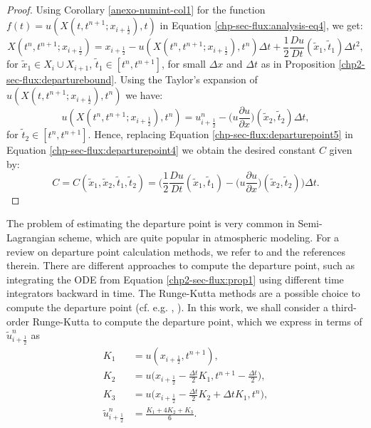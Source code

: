 \begin{proof}
Using Corollary \ref{anexo-numint-col1} for the function $f(t) = u(X(t,t^{n+1};x_{i+\frac{1}{2}}),t)$
in Equation  \eqref{chp-sec-flux:analysis-eq4}, we get:
\begin{equation}
	\label{chp-sec-flux:departurepoint4}
	X(t^n,t^{n+1};x_{i+\frac{1}{2}}) = x_{i+\frac{1}{2}} - u(X(t^n,t^{n+1};x_{i+\frac{1}{2}}),t^n)\Delta t + \frac{1}{2}\frac{Du}{Dt}(\tilde{x}_1,\tilde{t}_1)\Delta t^2,
\end{equation}
for $\tilde{x}_1 \in X_i \cup X_{i+1}$, $\tilde{t}_1 \in [t^n, t^{n+1}]$, for small $\Delta x$ and $\Delta t$ as in Proposition \ref{chp2-sec-flux:departurebound}.
Using the Taylor's expansion of $u(X(t,t^{n+1};x_{i+\frac{1}{2}}),t^n)$ we have:
\begin{equation}
	\label{chp-sec-flux:departurepoint5}
	u(X(t^n,t^{n+1};x_{i+\frac{1}{2}}),t^n) = u^n_{i+\frac{1}{2}} - \bigg(u\frac{\partial u}{\partial x}\bigg)(\tilde{x}_2,\tilde{t}_2)\Delta t,
\end{equation}
for $\tilde{t}_2 \in [t^n, t^{n+1}]$.
Hence, replacing Equation \eqref{chp-sec-flux:departurepoint5} in Equation \eqref{chp-sec-flux:departurepoint4} 
we obtain the desired constant $C$ given by:
\begin{equation}
	\label{chp-sec-flux:departurepoint6}
	C =  C(\tilde{x}_1, \tilde{x}_2, \tilde{t}_1, \tilde{t}_2) = 
	\bigg( \frac{1}{2}\frac{Du}{Dt}(\tilde{x}_1,\tilde{t}_1) - \bigg(u\frac{\partial u}{\partial x}\bigg)(\tilde{x}_2,\tilde{t}_2)\bigg)\Delta t.
\end{equation}
\end{proof}
The problem of estimating the departure point is very common in Semi-Lagrangian scheme,
which are quite popular in atmospheric modeling.
For a review on departure point calculation methods, we refer to  \citet[Chapter 3]{tumolo:2011} and the references therein. 
There are different approaches to compute the departure point, such as integrating the ODE from Equation \ref{chp2-sec-flux:prop1}
using different time integrators \citep{durran:2011} backward in time.
The Runge-Kutta methods are a possible choice to compute the departure point (cf. e.g. \citet{guo:2014}, \citet{lu:2022}). In this work,
we shall consider a third-order Runge-Kutta to compute the departure point, which we express in terms of $\tilde{u}^n_{i+\frac{1}{2}}$ as
\begin{align}
	\label{chp-sec-flux:dp_RK3}		
	K_1 &= u(x_{i+\frac{1}{2}},t^{n+1}), \nonumber \\
	K_2 &= u\big(x_{i+\frac{1}{2}}-\frac{\Delta t}{2}K_1,t^{n+1}-\frac{\Delta t}{2}\big), \nonumber \\
	K_3 &= u\big(x_{i+\frac{1}{2}}-\frac{\Delta t}{2}K_2+{\Delta t}K_1,t^{n}\big), \nonumber\\
	\tilde{u}^n_{i+\frac{1}{2}} &= \frac{K_1+4K_2+K_3}{6}.
\end{align}
